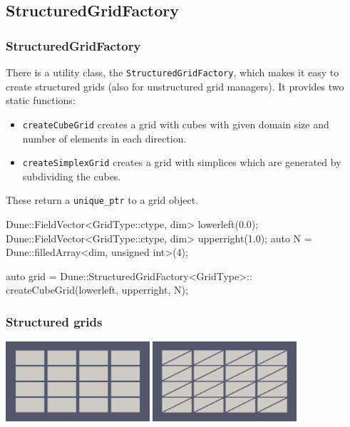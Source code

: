 \documentclass[aspectratio=169,11pt]{beamer}
\theoremstyle{definition}
\begin{document}
\subsection{StructuredGridFactory}

\begin{frame}[fragile]
\frametitle{StructuredGridFactory}
There is a utility class, the \lstinline!StructuredGridFactory!, which makes it easy to create
structured grids (also for unstructured grid managers). It provides two static functions:
\begin{itemize}
 \item \lstinline!createCubeGrid! creates a grid with cubes with given domain size and number
of elements in each direction.
\item \lstinline!createSimplexGrid! creates a grid with simplices which are generated by subdividing
the cubes.
\end{itemize}
These return a \lstinline!unique_ptr! to a grid object.

\begin{cppcode}
Dune::FieldVector<GridType::ctype, dim> lowerleft(0.0);
Dune::FieldVector<GridType::ctype, dim> upperright(1.0);
auto N = Dune::filledArray<dim, unsigned int>(4);

auto grid = Dune::StructuredGridFactory<GridType>::
              createCubeGrid(lowerleft, upperright, N);
\end{cppcode}

\end{frame}

\begin{frame}
 \frametitle{Structured grids}
 \centering
 \includegraphics[trim=85 85 85 85,clip=true,
 width=0.4\textwidth,
 height=0.4\textwidth]{figures/io/structure1}
 \hspace*{0.07\linewidth}
 \includegraphics[trim=85 85 85 85,clip=true,
 width=0.4\textwidth,
 height=0.4\textwidth]{figures/io/structure2}
\end{frame}
\end{document}
